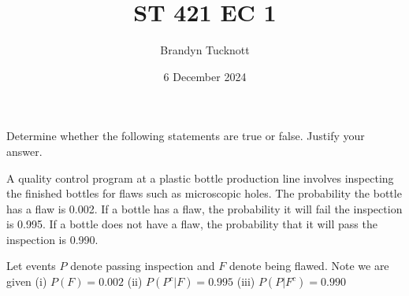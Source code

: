 \documentclass{exam}
\title{ST 421 EC 1}
\author{Brandyn Tucknott}
\date{6 December 2024}
\begin{document}
\maketitle

\begin{questions}

\question
Determine whether the following statements are true or false. Justify your answer.


\newpage




\question
A quality control program at a plastic bottle production line involves inspecting the finished bottles for flaws such as microscopic holes. The probability the bottle has a flaw is 0.002. If a bottle has a flaw, the probability it will fail the inspection is 0.995. If a bottle does not have a flaw, the probability that it will pass the inspection is 0.990.

\newline
Let events $P$ denote passing inspection and $F$ denote being flawed. Note we are given
\newline
(i)   $P(F) = 0.002$
\newline
(ii)  $P(P^c | F) = 0.995$
\newline
(iii) $P(P | F^c) = 0.990$
\begin{parts}

\end{parts}
\end{questions}
\end{document}
